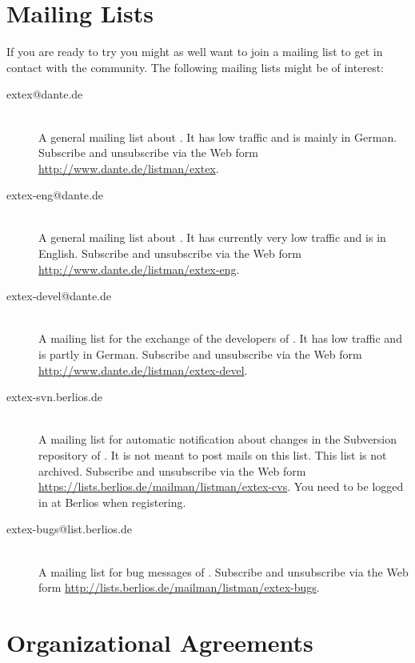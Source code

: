 \section{Mailing Lists}

If you are ready to try \ExTeX{} you might as well want to join a
mailing list to get in contact with the community. The following
mailing lists might be of interest:

\begin{description}
\item[extex@dante.de] \ \\
  A general mailing list about \ExTeX. It has low traffic and is
  mainly in German. Subscribe and unsubscribe via the Web form
  \url{http://www.dante.de/listman/extex}.

\item[extex-eng@dante.de] \ \\
  A general mailing list about \ExTeX. It has currently very low
  traffic and is in English. Subscribe and unsubscribe via the Web
  form \url{http://www.dante.de/listman/extex-eng}.

\item[extex-devel@dante.de] \ \\
  A mailing list for the exchange of the developers of \ExTeX. It has
  low traffic and is partly in German. Subscribe and unsubscribe via
  the Web form \url{http://www.dante.de/listman/extex-devel}.

\item[extex-svn.berlios.de] \ \\
  A mailing list for automatic notification about changes in the Subversion
  repository of \ExTeX. It is not meant to post mails on this list.
  This list is not archived. Subscribe and unsubscribe via the Web
  form \url{https://lists.berlios.de/mailman/listman/extex-cvs}. You
  need to be logged in at Berlios when registering.

\item[extex-bugs@list.berlios.de] \ \\
  A mailing list for bug messages of \ExTeX. Subscribe and unsubscribe
  via the Web form
  \url{http://lists.berlios.de/mailman/listman/extex-bugs}.
\end{description}

\section{Organizational Agreements}

